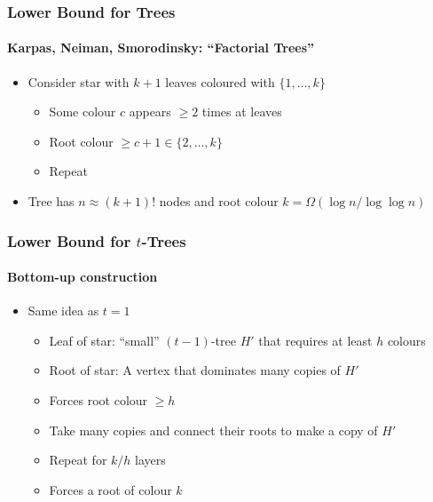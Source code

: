 \documentclass[xcolor=dvipsnames]{beamer}
\begin{document}
\begin{frame}
  \frametitle{Lower Bound for Trees}
  \framesubtitle{Karpas, Neiman, Smorodinsky: ``Factorial Trees''}

  \begin{itemize}
    \item Consider star with $k+1$ leaves coloured with $\{1,\ldots,k\}$
    \begin{itemize}
      \item<2-> Some colour $c$ appears $\ge\!\! 2$ times at leaves
      \item<4-> Root colour $\ge\!\!c+1 \in \{2,\ldots,k\}$
      \item<6-> Repeat
    \end{itemize}
    \item <8-> Tree has $n\approx(k+1)!$ nodes and root colour $k=\Omega(\log n/\log\log n)$
  \end{itemize}
    \begin{center}
    \end{center}
\end{frame}

\begin{frame}
  \frametitle{Lower Bound for $t$-Trees}
  \framesubtitle{Bottom-up construction}

  \begin{itemize}
    \item Same idea as $t=1$
    \begin{itemize}
      \item<1-> Leaf of star: ``small'' $(t-1)$-tree $H'$ that requires at least $h$ colours
      \item<3-> Root of star: A vertex that dominates many copies of $H'$
      \item<5-> Forces root colour $\ge h$
      \item<6-> Take many copies and connect their roots to make a copy of $H'$
      \item<7-> Repeat for $k/h$ layers
      \item<8-> Forces a root of colour $k$
    \end{itemize}
    \begin{center}
    \end{center}
  \end{itemize}
\end{frame}
\end{document}
